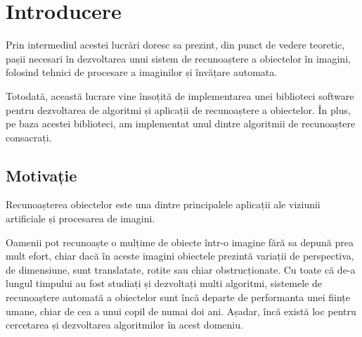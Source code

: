 \chapter{Introducere}


Prin intermediul acestei lucrări doresc sa prezint, din punct de vedere teoretic, pașii necesari în dezvoltarea unui sistem de recunoaștere a obiectelor în imagini, folosind tehnici de procesare a imaginilor și învățare automata.

Totodată, această lucrare vine însoțită de implementarea unei biblioteci software pentru dezvoltarea de algoritmi și aplicații de recunoaștere a obiectelor.
În plus, pe baza acestei biblioteci, am implementat unul dintre algoritmii de recunoaștere consacrați.



\section{Motivație}

Recunoașterea obiectelor este una dintre principalele aplicații ale viziunii artificiale și procesarea de imagini. 

Oamenii pot recunoaște o mulțime de obiecte într-o imagine fără sa depună prea mult efort, chiar dacă în aceste imagini obiectele prezintă variații de perspectiva, de dimensiune, sunt translatate, rotite sau chiar obstrucționate. 
Cu toate că de-a lungul timpului au fost studiați și dezvoltați multi algoritmi, sistemele de recunoaștere automată a obiectelor sunt încă departe de performanta unei ființe umane, chiar de cea a unui copil de numai doi ani.
Așadar, încă există loc pentru cercetarea și dezvoltarea algoritmilor în acest domeniu.


